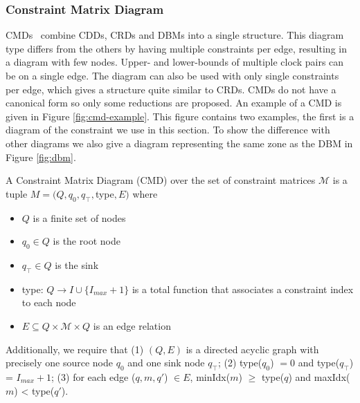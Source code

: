 \subsubsection{Constraint Matrix Diagram}
CMDs~\cite{5702245} combine CDDs, CRDs and DBMs into a single structure. This diagram type differs from the others by having multiple constraints per edge, resulting in a diagram with few nodes. Upper- and lower-bounds of multiple clock pairs can be on a single edge. The diagram can also be used with only single constraints per edge, which gives a structure quite similar to CRDs. CMDs do not have a canonical form so only some reductions are proposed. An example of a CMD is given in Figure \ref{fig:cmd-example}. This figure contains two examples, the first is a diagram of the constraint we use in this section. To show the difference with other diagrams we also give a diagram representing the same zone as the DBM in Figure \ref{fig:dbm}.
\begin{mydef}
A Constraint Matrix Diagram (CMD) over the set of constraint matrices $\mathcal{M}$ is a tuple $M = (Q,q_0,q_\top,$type$,E)$ where
\begin{itemize}
\item $Q$ is a finite set of nodes
\item $q_0 \in Q$ is the root node
\item $q_\top \in Q$ is the sink
\item type: $Q \rightarrow I \cup \{I_{max} + 1\}$ is a total function that associates a constraint index to each node
\item $E \subseteq Q \times \mathcal{M} \times Q$ is an edge relation
\end{itemize}
Additionally, we require that (1) $(Q,E)$ is a directed acyclic graph with precisely one source node $q_0$ and one sink node $q_\top$; (2) type($q_0$) $= 0$ and type($q_\top$) = $I_{max} + 1$; (3) for each edge ($q,m,q'$) $\in E$, minIdx($m$) $\geq$ type($q$) and maxIdx($m$) < type($q'$). 
\end{mydef}

